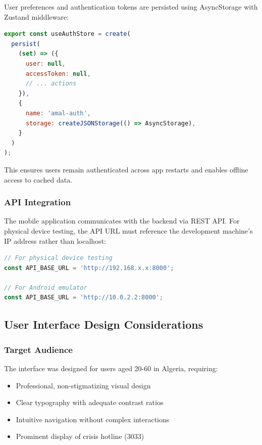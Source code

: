 User preferences and authentication tokens are persisted using AsyncStorage with Zustand middleware:

\begin{lstlisting}[language=JavaScript, caption=Persistent State Configuration]
export const useAuthStore = create(
  persist(
    (set) => ({
      user: null,
      accessToken: null,
      // ... actions
    }),
    {
      name: 'amal-auth',
      storage: createJSONStorage(() => AsyncStorage),
    }
  )
);
\end{lstlisting}

This ensures users remain authenticated across app restarts and enables offline access to cached data.

\subsubsection{API Integration}

The mobile application communicates with the backend via REST API. For physical device testing, the API URL must reference the development machine's IP address rather than localhost:

\begin{lstlisting}[language=JavaScript, caption=API Configuration]
// For physical device testing
const API_BASE_URL = 'http://192.168.x.x:8000';

// For Android emulator
const API_BASE_URL = 'http://10.0.2.2:8000';
\end{lstlisting}

\subsection{User Interface Design Considerations}

\subsubsection{Target Audience}

The interface was designed for users aged 20-60 in Algeria, requiring:

\begin{itemize}
    \item Professional, non-stigmatizing visual design
    \item Clear typography with adequate contrast ratios
    \item Intuitive navigation without complex interactions
    \item Prominent display of crisis hotline (3033)
\end{itemize}

